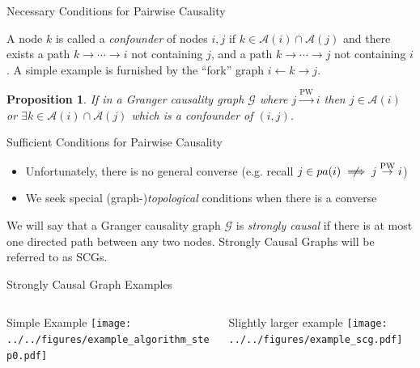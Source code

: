 \documentclass{beamer} %
\newtheorem*{proposition}{Proposition}
\def\pwgc{\overset{\text{PW}}{\rightarrow}}  %
\def\gcg{\mathcal{G}}  %
\newcommand{\pa}[1]{pa(#1)}  %
\newcommand{\anc}[1]{\mathcal{A}(#1)}  %
\newcommand{\gcgpath}[2]{#1 \rightarrow \cdots \rightarrow #2}  %
\begin{document}
\begin{frame}{Necessary Conditions for Pairwise Causality}
  \begin{definition}[Confounder]
    A node $k$ is called a \textit{confounder} of nodes $i, j$ if
    $k \in \anc{i} \cap \anc{j}$ and there exists a path
    $\gcgpath{k}{i}$ not containing $j$, and a path $\gcgpath{k}{j}$
    not containing $i$.  A simple example is furnished by the ``fork''
    graph $i \leftarrow k \rightarrow j$.
  \end{definition}\pause

\begin{proposition}
  \label{prop:ancestor_properties}
  If in a Granger causality graph $\gcg$ where $j \pwgc i$ then
  $j \in \anc{i}$ or $\exists k \in \anc{i} \cap\anc{j}$ which is a
  confounder of $(i, j)$.
\end{proposition}
\end{frame}

\begin{frame}{Sufficient Conditions for Pairwise Causality}
  \begin{itemize}
    \item{Unfortunately, there is no general converse (e.g. recall $j \in \pa{i} \centernot\implies j \pwgc i$)}\pause
    \item{We seek special (graph-)\textit{topological} conditions when there is a converse}\pause
  \end{itemize}

  \begin{definition}
    \label{def:strongly_causal}
    We will say that a Granger causality graph $\gcg$ is
    \textit{strongly causal} if there is at most one directed path between
    any two nodes.  Strongly Causal Graphs will be referred to as SCGs.
  \end{definition}
\end{frame}

\begin{frame}{Strongly Causal Graph Examples}
  \begin{columns}
    \begin{column}{0.5\linewidth}
      \small{Simple Example}
      \texttt{[image: ../../figures/example\_algorithm\_step0.pdf]}\pause
    \end{column}
    \begin{column}{0.5\linewidth}
      \small{Slightly larger example}
      \texttt{[image: ../../figures/example\_scg.pdf]}
    \end{column}
  \end{columns}
\end{frame}
\end{document}
